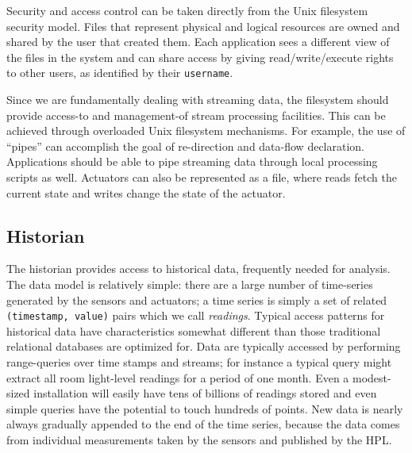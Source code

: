 Security and access control can be taken directly from the Unix filesystem security model.  Files that represent physical and logical resources are owned and shared by the user that created them.  Each application sees a different view of the files in the system and can share access by giving read/write/execute rights to other users, as identified by their {\tt username}.


Since we are fundamentally dealing with streaming data, the filesystem should provide access-to and management-of stream processing facilities.  This can be achieved through overloaded Unix filesystem  mechanisms.  For example, the use of ``pipes'' can accomplish the goal of re-direction and data-flow declaration.  Applications should be able to pipe streaming data through local processing scripts as well.  Actuators can also be represented as a file, where reads fetch the current state and writes change the state of the actuator.

\subsection{Historian}
The historian provides access to historical data, frequently needed for analysis.  The data model is relatively simple: there are a large number of time-series generated by the sensors and actuators; a time series is simply a set of related {\tt (timestamp, value)} pairs which we call {\it readings}. 
%
Typical access patterns for historical data have characteristics somewhat different than those traditional relational databases are optimized for.  Data are typically accessed by performing range-queries over time stamps and streams; for instance a typical query might extract all room light-level readings for a period of one month.  Even a modest-sized installation will easily have tens of billions of readings stored and even simple queries have the potential to touch hundreds of points.  New data is nearly always gradually appended to the end of the time series, because the data comes from individual measurements taken by the sensors and published by the HPL.

